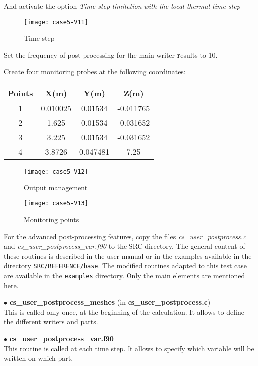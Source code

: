 And activate the option
{\itshape Time step limitation with the local thermal time step}

\begin{figure}[h!]
\begin{center}
\texttt{[image: case5-V11]}
\caption{Time step}
\label{fig11_e5}
\end{center}
\end{figure}


\newpage
Set the frequency of post-processing for the main writer {\textbf results} to 10.

Create four monitoring probes at the following coordinates:
\begin{center}
\begin{tabular}{|c|c|c|c|}
\hline
Points & X(m) & Y(m) & Z(m)\\
\hline
1 & 0.010025 & 0.01534 & -0.011765 \\
\hline
2 & 1.625 & 0.01534 & -0.031652 \\
\hline
3 & 3.225 & 0.01534 & -0.031652 \\
\hline
4 & 3.8726 & 0.047481 & 7.25 \\
\hline
\end{tabular}
\end{center}

\begin{figure}[h!]
\begin{center}
\texttt{[image: case5-V12]}
\caption{Output management}
\label{fig12_e5}
\end{center}
\end{figure}

\begin{figure}[h!]
\begin{center}
\texttt{[image: case5-V13]}
\caption{Monitoring points}
\label{fig12bis_e5}
\end{center}
\end{figure}

\newpage
For the advanced post-processing features, copy the files
{\itshape cs\_user\_postprocess.c} and {\itshape cs\_user\_postprocess\_var.f90} to the SRC
directory. The general content of these routines is described in the user manual
or in the examples available in the directory \texttt{SRC/REFERENCE/base}. The modified
routines adapted to this test case are available in the \texttt{examples}
directory. Only the main elements are mentioned here.

$\bullet$ {\bfseries cs\_user\_postprocess\_meshes} (in  {\bfseries cs\_user\_postprocess.c})\\
This  is called only once, at the beginning of the calculation. It allows
to define the different writers and parts.

$\bullet$ {\bfseries cs\_user\_postprocess\_var.f90}\\
This routine is called at each time step. It allows to specify which variable
will be written on which part.

